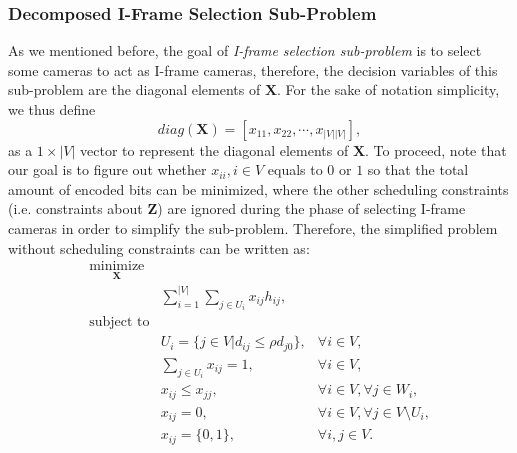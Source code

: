 %
\subsubsection{Decomposed I-Frame Selection Sub-Problem}
\label{sec::iFrameSelectionSubProbFormulation}
As we mentioned before, the goal of \emph{I-frame selection sub-problem} is to select some cameras to act as I-frame cameras, therefore, the decision variables of this sub-problem are the diagonal elements of $\mathbf{X}$.
For the sake of notation simplicity, we thus define
\begin{equation}
diag(\mathbf{X}) = \left[ x_{11}, x_{22}, \cdots, x_{|V||V|} \right],
\end{equation}
as a $1 \times |V|$ vector to represent the diagonal elements of $\mathbf{X}$.
To proceed, note that our goal is to figure out whether ${x_{ii},i \in V}$ equals to $0$ or $1$ so that the total amount of encoded bits can be minimized, where the other scheduling constraints (i.e. constraints about $\mathbf{Z}$) are ignored during the phase of selecting I-frame cameras in order to simplify the sub-problem.
Therefore, the simplified problem without scheduling constraints can be written as:
\begin{align}
\underset{\mathbf{X}}{\text{minimize}} & & \nonumber \\
	&\sum_{i=1}^{|V|} \sum_{j \in U_i}  x_{ij} h_{ij}, & \nonumber \\
\text{subject to} & & \nonumber \\
	&U_i = \{ j \in V | d_{ij} \leq \rho d_{j0} \}, &\forall i \in V, \nonumber \\
	&\sum_{j \in U_i} x_{ij} = 1, &\forall i \in V, \nonumber \\
	&x_{ij} \leq x_{jj}, &\forall i \in V, \forall j \in W_i, \nonumber \\
	&x_{ij} = 0, &\forall i \in V, \forall j \in V \setminus U_i, \nonumber \\
	&x_{ij} = \{0,1\}, &\forall i,j \in V.
\label{eq::formulationSimplified}
\end{align}
